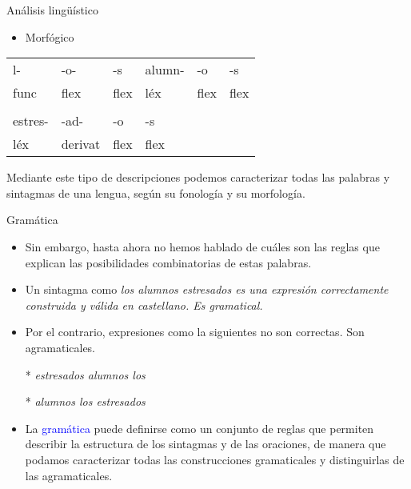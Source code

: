 \documentclass{beamer}
\begin{document}
\begin{frame}{Análisis lingüístico}

\begin{itemize}
	\item Morfógico
\end{itemize}
	
\begin{center}
\begin{tabular}{l l l l l l}
l- & -o- & -s & alumn- & -o & -s \\ 
func & flex & flex & léx & flex & flex \\
 & & & & & \\
estres- & -ad- & -o & -s & & \\
léx & derivat & flex & flex & & \\
\end{tabular}
\end{center}	

Mediante este tipo de descripciones podemos caracterizar todas las palabras y sintagmas de una lengua, según su fonología y su morfología.
	
\end{frame}

\begin{frame}{Gramática}

\begin{itemize}
	\item Sin embargo, hasta ahora no hemos hablado de cuáles son las reglas que explican las posibilidades combinatorias de estas palabras. 
	\item Un sintagma como \it{los alumnos estresados} es una expresión correctamente construida y válida en castellano. Es gramatical.
	\item Por el contrario, expresiones como la siguientes no son correctas. Son agramaticales. 
	
	* \it{estresados alumnos los}
	
	* \it{alumnos los estresados}
	
	\item La \textcolor{blue}{gramática} puede definirse como un conjunto de reglas  que permiten describir la estructura de los sintagmas y de las oraciones, de manera que podamos caracterizar todas las construcciones gramaticales y distinguirlas de las agramaticales. 
\end{itemize}
\end{frame}
\end{document}
